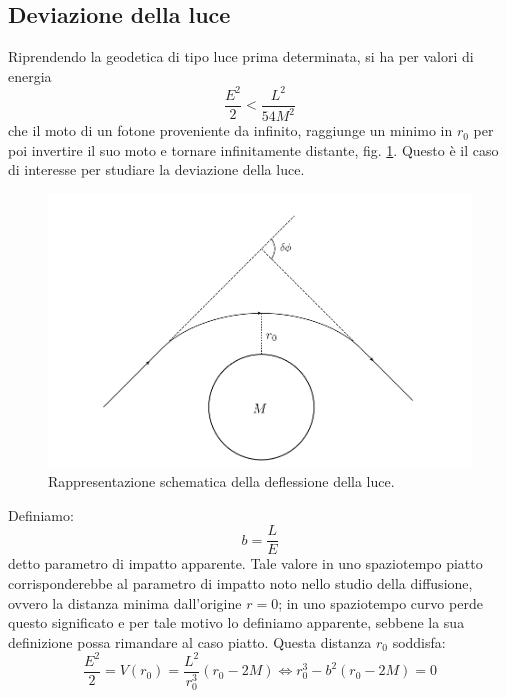 \subsection{Deviazione della luce}
Riprendendo la geodetica di tipo luce prima determinata, si ha per valori di energia
\begin{equation*}
    \frac{E^2}{2} < \frac{L^2}{54M^2}
\end{equation*}
che il moto di un fotone proveniente da infinito, raggiunge un minimo in $r_0$ per poi invertire il suo moto e tornare infinitamente distante, fig. \ref{fig.deflessione}. Questo è il caso di interesse per studiare la deviazione della luce.
\begin{figure}
    \centering
    \includegraphics[scale=0.5]{immagini/deflessione.png}
    \caption{Rappresentazione schematica della deflessione della luce.}
    \label{fig.deflessione}
\end{figure}
Definiamo:
\begin{equation*}
    b = \frac{L}{E}
\end{equation*}
detto parametro di impatto apparente. Tale valore in uno spaziotempo piatto corrisponderebbe al parametro di impatto noto nello studio della diffusione, ovvero la distanza minima dall'origine $r=0$; in uno spaziotempo curvo perde questo significato e per tale motivo lo definiamo apparente, sebbene la sua definizione possa rimandare al caso piatto. Questa distanza $r_0$ soddisfa:
\begin{equation*}
    \frac{E^2}{2} = V(r_0) = \frac{L^2}{r_0^3}(r_0 -2M) \iff r_0^3 - b^2(r_0-2M) = 0
\end{equation*}

